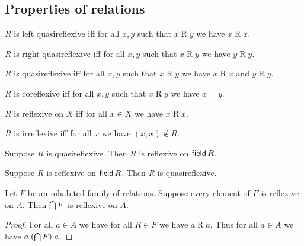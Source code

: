 


\subsection{Properties of relations}

\begin{definition}\label{left_quasireflexive}
    $R$ is left quasireflexive iff
    for all $x, y$ such that $x\mathrel{R} y$
    we have $x\mathrel{R}x$.
\end{definition}

\begin{definition}\label{right_quasireflexive}
    $R$ is right quasireflexive iff
    for all $x, y$ such that $x\mathrel{R} y$
    we have $y\mathrel{R}y$.
\end{definition}

\begin{definition}\label{quasireflexive}
    $R$ is quasireflexive iff
    for all $x, y$ such that $x\mathrel{R} y$
    we have $x\mathrel{R}x$ and $y\mathrel{R}y$.
\end{definition}

\begin{definition}\label{coreflexive}
    $R$ is coreflexive iff
    for all $x, y$ such that $x\mathrel{R} y$
    we have $x = y$.
\end{definition}

\begin{definition}\label{reflexive_on}
    $R$ is reflexive on $X$ iff
    for all $x\in X$
    we have $x\mathrel{R}x$.
\end{definition}

\begin{definition}\label{irreflexive}
    $R$ is irreflexive iff
    for all $x$ we have $(x,x)\notin R$.
\end{definition}


\begin{proposition}\label{quasireflexive_implies_reflexive_on_fld}
    Suppose $R$ is quasireflexive.
    Then $R$ is reflexive on $\operatorname{\mathsf{field}}R$.
\end{proposition}

\begin{proposition}\label{reflexive_on_fld_impliesquasireflexive}
    Suppose $R$ is reflexive on $\operatorname{\mathsf{field}}R$.
    Then $R$ is quasireflexive.
\end{proposition}

\begin{proposition}\label{inters_of_family_of_reflexive_relations_is_reflexive}
    Let $F$ be an inhabited family of relations.
    Suppose every element of $F$ is reflexive on $A$.
    Then $\bigcap F$ is reflexive on $A$.
\end{proposition}
\begin{proof}
    For all $a\in A$ we have for all $R\in F$ we have $a\mathrel{R} a$.
    Thus for all $a\in A$ we have $a\mathrel{(\bigcap F)} a$.
\end{proof}

